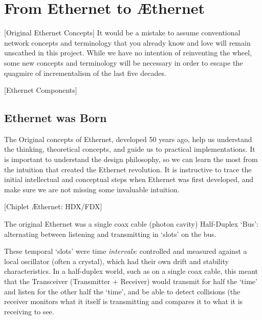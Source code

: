 \documentclass[../../../OAE-SPEC-MAIN.tex]{subfiles}
\begin{document}
\section{From Ethernet to Æthernet}


[Original Ethernet Concepts]
It would be a mistake to assume conventional network concepts and terminology that you already know and love will remain unscathed in this project. While we have no intention of reinventing the wheel,  some new concepts and terminology will be necessary in order to escape the quagmire of incrementalism of the last five decades.  


[Ethernet Components]


\subsection{Ethernet was Born}

The Original concepts of Ethernet, developed 50 years ago, help us understand the thinking, theoretical concepts, and guide us  to practical implementations. It is important to understand the design philosophy, so we can learn the most from the intuition that created the Ethernet revolution.  It is instructive to trace the initial intellectual and conceptual steps when Ethernet was first developed, and make sure we are not missing some invaluable intuition.


  
[Chiplet Æthernet: HDX/FDX]
   
The original Ethernet was a single coax cable (photon cavity) Half-Duplex `Bus':  alternating between listening and transmitting in `slots' on the bus.
\bigskip
 
These temporal `slots' were time \emph{intervals}: controlled and measured against a local oscillator (often a crystal), which had their own drift and stability characteristics. In a half-duplex world, such as on a single coax cable, this meant that the Transceiver (Transmitter + Receiver) would transmit for half the `time' and listen for the other half the `time', and be able to detect collisions (the receiver monitors what it itself is transmitting and compares it to what it is receiving to see. 
\end{document}
